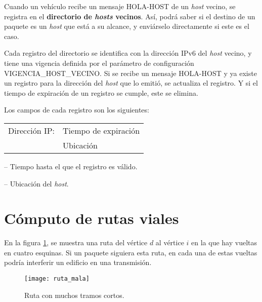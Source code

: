 \begin{sloppypar}
Cuando un vehículo recibe un mensaje \mbox{HOLA-HOST} de un \textit{host}
vecino, se registra en el \textbf{directorio de \textit{hosts} vecinos}. Así,
podrá saber si el destino de un paquete es un \textit{host} que está a su
alcance, y enviárselo directamente si este es el caso.
\end{sloppypar}

\begin{sloppypar}
Cada registro del directorio se identifica con la dirección IPv6 del
\textit{host} vecino, y tiene una vigencia definida por el parámetro de
configuración \mbox{VIGENCIA\_HOST\_VECINO}. Si se recibe un mensaje
\mbox{HOLA-HOST} y ya existe un registro para la dirección del \textit{host} que
lo emitió, se actualiza el registro. Y si el tiempo de expiración de un registro
se cumple, este se elimina.
\end{sloppypar}

Los campos de cada registro son los siguientes:

\begin{center}
\begin{tabular}{ r l }
Dirección IP: & Tiempo de expiración \\
& Ubicación \\
\end{tabular}
\end{center}

 -- Tiempo hasta el que el registro es válido.

 -- Ubicación del \textit{host}.

\section{Cómputo de rutas viales}
\label{subsec:computo_rutas_viales}

En la figura \ref{fig:ruta_mala}, se muestra una ruta del vértice $d$ al vértice
$i$ en la que hay vueltas en cuatro esquinas. Si un paquete siguiera esta
ruta, en cada una de estas vueltas podría interferir un edificio en una
transmisión.

\begin{figure}[th!]
\centering
\texttt{[image: ruta\_mala]}
\decoRule
\caption[Ruta con muchos tramos cortos]{Ruta con muchos tramos cortos.}
\label{fig:ruta_mala}
\end{figure}

